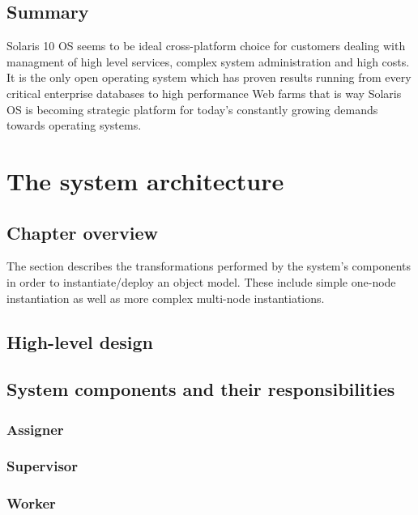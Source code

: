 \documentclass[11pt]{book}
\begin{document}
    \section*{Summary}

                Solaris 10 OS seems to be ideal cross-platform choice for customers dealing with managment of high level services, complex system administration and high costs. It is the only open operating system which has proven 
                results running from every critical enterprise databases to high performance Web farms that is way Solaris OS is becoming strategic platform for today's constantly growing demands towards operating systems.

  \chapter{The system architecture}

    \section*{Chapter overview}

      The  section describes the transformations performed by the system's components in order to instantiate/deploy an object model. These include simple one-node instantiation as well as more complex multi-node instantiations.



    \section{High-level design}


    \section{System components and their responsibilities}

      \subsection{Assigner}

      \subsection{Supervisor}

      \subsection{Worker}
\end{document}
